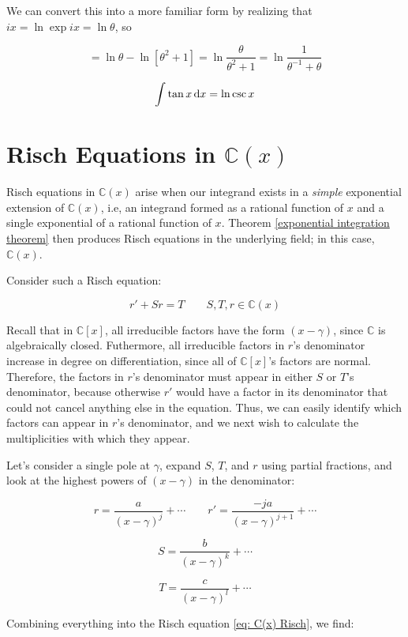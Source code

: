 We can convert this into a more familiar form by realizing 
that $ix = \ln \exp ix = \ln \theta$, so

$$  = \ln \theta - \ln \left[ \theta^2 + 1 \right]
= \ln \frac{\theta}{\theta^2 + 1}
= \ln \frac{1}{\theta^{-1} + \theta}$$

$$\int \tan x \, {\rm d}x = \ln \csc x$$

\endexample

\vfill\eject
\section{Risch Equations in ${\mathbb C}(x)$}

Risch equations in ${\mathbb C}(x)$ arise when our integrand exists in
a {\it simple} exponential extension of ${\mathbb C}(x)$,
i.e, an integrand formed as a rational function of $x$ and a
single exponential of a rational function of $x$.  Theorem
\ref{exponential integration theorem}
then produces Risch equations in the underlying field;
in this case, ${\mathbb C}(x)$.

Consider such a Risch equation:

\begin{equation}
\label{eq: C(x) Risch}
r' + S r = T \qquad S,T,r \in {\mathbb C}(x)
\end{equation}

Recall that in ${\mathbb C}[x]$, all irreducible factors have
the form $(x-\gamma)$, since ${\mathbb C}$ is algebraically
closed.  Futhermore, all irreducible factors in $r$'s
denominator increase in degree on differentiation,
since all of ${\mathbb C}[x]$'s factors are normal.
Therefore, the factors in $r$'s denominator must appear in
either $S$ or $T$'s denominator, because otherwise $r'$
would have a factor in its denominator that could not
cancel anything else in the equation.
Thus, we can easily identify
which factors can appear in $r$'s denominator, and we next
wish to calculate the multiplicities with which they appear.

Let's consider a single pole at
$\gamma$, expand $S$, $T$, and $r$ using partial fractions, and look
at the highest powers of $(x-\gamma)$ in the denominator:

$$r = \frac{a}{(x-\gamma)^j} + \cdots  \qquad  r' = \frac{-ja}{(x-\gamma)^{j+1}} + \cdots$$

$$S = \frac{b}{(x-\gamma)^k} + \cdots$$

$$T = \frac{c}{(x-\gamma)^l} + \cdots$$

Combining everything into the Risch equation \eqref{eq: C(x) Risch}, we find:


